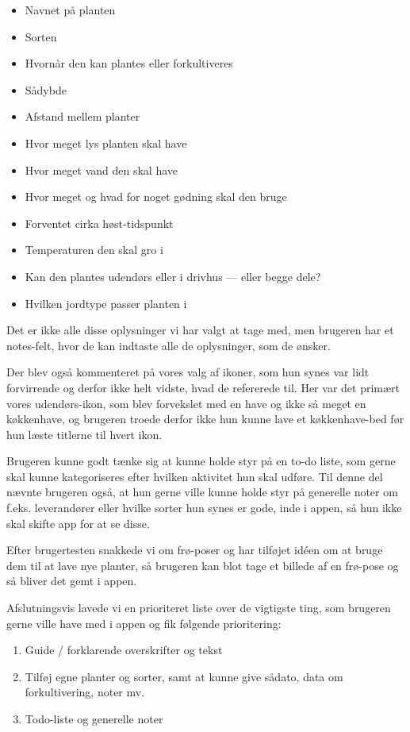 \begin{itemize}
    \item Navnet på planten
    \item Sorten
    \item Hvornår den kan plantes eller forkultiveres
    \item Sådybde
    \item Afstand mellem planter
    \item Hvor meget lys planten skal have
    \item Hvor meget vand den skal have
    \item Hvor meget og hvad for noget gødning skal den bruge
    \item Forventet cirka høst-tidspunkt
    \item Temperaturen den skal gro i
    \item Kan den plantes udendørs eller i drivhus --- eller begge dele?
    \item Hvilken jordtype passer planten i
\end{itemize}

Det er ikke alle disse oplysninger vi har valgt at tage med, men brugeren har et notes-felt, hvor de kan indtaste alle de oplysninger, som de ønsker.

Der blev også kommenteret på vores valg af ikoner, som hun synes var lidt forvirrende og derfor ikke helt vidste, hvad de refererede til. Her var det primært vores udendørs-ikon, som blev forvekslet med en have og ikke så meget en køkkenhave, og brugeren troede derfor ikke hun kunne lave et køkkenhave-bed før hun læste titlerne til hvert ikon.

Brugeren kunne godt tænke sig at kunne holde styr på en to-do liste, som gerne skal kunne kategoriseres efter hvilken aktivitet hun skal udføre. Til denne del nævnte brugeren også, at hun gerne ville kunne holde styr på generelle noter om f.eks. leverandører eller hvilke sorter hun synes er gode, inde i appen, så hun ikke skal skifte app for at se disse.

Efter brugertesten snakkede vi om frø-poser og har tilføjet idéen om at bruge dem til at lave nye planter, så brugeren kan blot tage et billede af en frø-pose og så bliver det gemt i appen.

Afslutningsvis lavede vi en prioriteret liste over de vigtigste ting, som brugeren gerne ville have med i appen og fik følgende prioritering:

\begin{enumerate}
    \item Guide / forklarende overskrifter og tekst
    \item Tilføj egne planter og sorter, samt at kunne give sådato, data om forkultivering, noter mv.
    \item Todo-liste og generelle noter
\end{enumerate}
